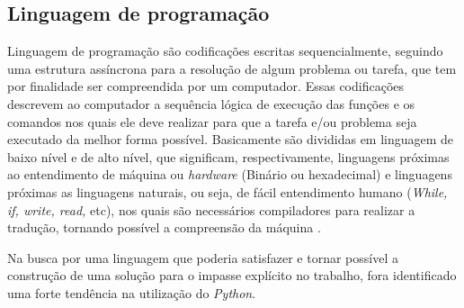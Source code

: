 \subsection{{Linguagem de programação}}

Linguagem de programação são codificações escritas sequencialmente, seguindo uma estrutura assíncrona para a resolução de algum problema ou tarefa, que tem por finalidade ser compreendida por um computador. Essas codificações descrevem ao computador a sequência lógica de execução das funções e os comandos nos quais ele deve realizar para que a tarefa e/ou problema seja executado da melhor forma possível. Basicamente são divididas em linguagem de baixo nível e de alto nível, que significam, respectivamente, linguagens próximas ao entendimento de máquina ou \textit{hardware} (Binário ou hexadecimal) e linguagens próximas as linguagens naturais, ou seja, de fácil entendimento humano (\textit{While, if, write, read,} etc), nos quais são necessários compiladores para realizar a tradução, tornando possível a compreensão da máquina \cite{KELLEHER2005}.

Na busca por uma linguagem que poderia satisfazer e tornar possível a construção de uma solução para o impasse explícito no trabalho, fora identificado uma forte tendência na utilização do \textit{Python}.

\begin{comment}
De acordo com \citeonline{PILGRIM2009}, a projeção da linguagem enfatiza o trabalho do programador sobre o computacional, possibilitando assim a construção de bibliotecas e frameworks com uma facilidade acima do normal.

\textit{Python} foi criado por Guido van Rossum em 1991, com a ajuda de seus colegas Jack Jansen e Sjoerd Mullender. O objetivo deles era criar uma linguagem de fácil entendimento, orientada a objetos, menos complexa possível \cite{SONGINI2005}.

Segundo \citeonline{OLIVEIRA2007}, a linguagem sofreu vários ajustes no decorrer dos anos, tornando-se muito popular dentre os desenvolvedores e, consequentemente, dando início a inúmeras aplicações. Portanto, \textit{Python} é uma linguagem orientada a objetos, fortemente tipada, com propositos gerais de alto nível e de código aberto, objetivando uma construção ágil no desenvolvimento de aplicações. Sua sintaxe é bem simples e de fácil entendimento, reduzindo o custo de manutenção em \textit{softwares} criados a partir desta. Suas bibliotecas garantem ao programador um vasto acervo de funções que tem por finalidade facilitar o seu trabalho, reduzir tempo de codificação e evitar arquivos com extensas linhas de código. Devido à comunidade de código aberto, onde desenvolvedores tem acesso ao seu código fonte, a popularização da linguagem vem crescendo de forma significativa, visto que esta ainda não é muito conhecida \cite{SONGINI2005}.
\end{comment}